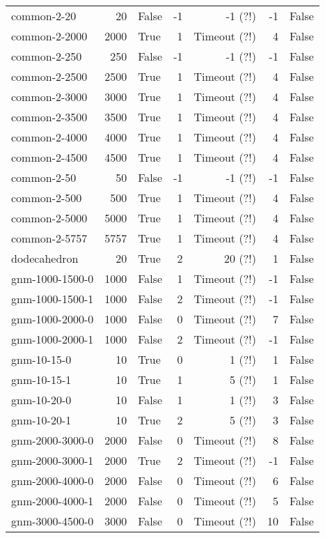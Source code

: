 \begin{longtable}{lrlrrrl}
common-2-20 & 20 & False & -1 & -1 (?!) & -1 & False \\
common-2-2000 & 2000 & True & 1 & Timeout (?!) & 4 & False \\
common-2-250 & 250 & False & -1 & -1 (?!) & -1 & False \\
common-2-2500 & 2500 & True & 1 & Timeout (?!) & 4 & False \\
common-2-3000 & 3000 & True & 1 & Timeout (?!) & 4 & False \\
common-2-3500 & 3500 & True & 1 & Timeout (?!) & 4 & False \\
common-2-4000 & 4000 & True & 1 & Timeout (?!) & 4 & False \\
common-2-4500 & 4500 & True & 1 & Timeout (?!) & 4 & False \\
common-2-50 & 50 & False & -1 & -1 (?!) & -1 & False \\
common-2-500 & 500 & True & 1 & Timeout (?!) & 4 & False \\
common-2-5000 & 5000 & True & 1 & Timeout (?!) & 4 & False \\
common-2-5757 & 5757 & True & 1 & Timeout (?!) & 4 & False \\
dodecahedron & 20 & True & 2 & 20 (?!) & 1 & False \\
gnm-1000-1500-0 & 1000 & False & 1 & Timeout (?!) & -1 & False \\
gnm-1000-1500-1 & 1000 & False & 2 & Timeout (?!) & -1 & False \\
gnm-1000-2000-0 & 1000 & False & 0 & Timeout (?!) & 7 & False \\
gnm-1000-2000-1 & 1000 & False & 2 & Timeout (?!) & -1 & False \\
gnm-10-15-0 & 10 & True & 0 & 1 (?!) & 1 & False \\
gnm-10-15-1 & 10 & True & 1 & 5 (?!) & 1 & False \\
gnm-10-20-0 & 10 & False & 1 & 1 (?!) & 3 & False \\
gnm-10-20-1 & 10 & True & 2 & 5 (?!) & 3 & False \\
gnm-2000-3000-0 & 2000 & False & 0 & Timeout (?!) & 8 & False \\
gnm-2000-3000-1 & 2000 & True & 2 & Timeout (?!) & -1 & False \\
gnm-2000-4000-0 & 2000 & False & 0 & Timeout (?!) & 6 & False \\
gnm-2000-4000-1 & 2000 & False & 0 & Timeout (?!) & 5 & False \\
gnm-3000-4500-0 & 3000 & False & 0 & Timeout (?!) & 10 & False \\

\end{longtable}
